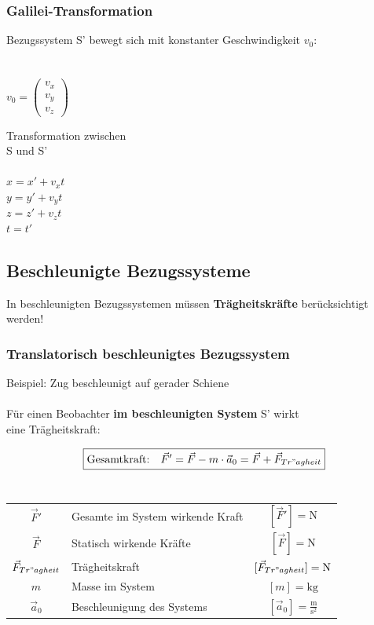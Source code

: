 	
	\subsubsection{Galilei-Transformation}
	
	\begin{minipage}{0.48\linewidth}
	Bezugssystem S' bewegt sich mit konstanter Geschwindigkeit $v_0$: \\
	\\
	\\
	$v_0 = \begin{pmatrix}
	v_x \\ v_y \\ v_z
	\end{pmatrix}$
	\end{minipage}
	\hfill
	\begin{minipage}{0.42\linewidth}
	Transformation zwischen \\
	S und S' \\
	\\
	$x = x' + v_x t$ \\
	$y = y' + v_y t$ \\
	$z  = z' + v_z t$ \\
	$t = t'$
	\end{minipage}
	
	
	
	
	
	
	\subsection{Beschleunigte Bezugssysteme}
	In beschleunigten Bezugssystemen müssen \textbf{Trägheitskräfte} berücksichtigt werden!
	
	
	\subsubsection{Translatorisch beschleunigtes Bezugssystem}
	Beispiel: Zug beschleunigt auf gerader Schiene \\
	\\
	Für einen Beobachter \textbf{im beschleunigten System} S' wirkt \\
	eine Trägheitskraft: 
	
	$$ \boxed{ \text{Gesamtkraft:} \quad \vec{F}' = \vec{F} - m \cdot \vec{a}_0 = \vec{F} + \vec{F}_{Tr"agheit} }$$ \\
	
	
	\begin{tabular}{c l c}
	$\vec{F}'$ & Gesamte im System wirkende Kraft & $[\vec{F}'] = \mathrm{N}$ \\
	$\vec{F}$ & Statisch wirkende Kräfte & $[\vec{F}] = \mathrm{N}$ \\
	$\vec{F}_{Tr"agheit}$ & Trägheitskraft & $[\vec{F}_{Tr"agheit}] = \mathrm{N}$ \\
	$m$ & Masse im System & $[m] = \mathrm{kg}$ \\
	$\vec{a}_0$ & Beschleunigung des Systems & $[\vec{a}_0] = \mathrm{\frac{m}{s^2}}$ \\
	\end{tabular}
	
